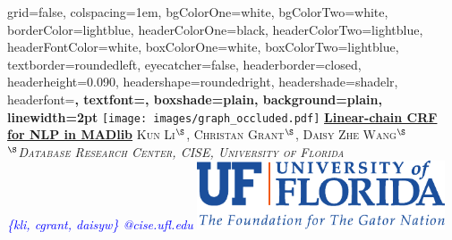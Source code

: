 \documentclass[landscape,final,a0paper,fontscale=0.285]{baposter}
\begin{document}
		\begin{poster}%
		  {
		  grid=false,
		  colspacing=1em,
		  bgColorOne=white,
		  bgColorTwo=white,
		  borderColor=lightblue,
		  headerColorOne=black,
		  headerColorTwo=lightblue,
		  headerFontColor=white,
		  boxColorOne=white,
		  boxColorTwo=lightblue,
		  textborder=roundedleft,
		  eyecatcher=false,
		  headerborder=closed,
		  headerheight=0.090\textheight,
		  headershape=roundedright,
		  headershade=shadelr,
		  headerfont=\Large\bf\textsc, %
		  textfont={\setlength{\parindent}{1.5em}},
		  boxshade=plain,
		  background=plain,
		  linewidth=2pt
		  }
		  {\texttt{[image: images/graph\_occluded.pdf]}} 
		  {\bf{\underline{Linear-chain CRF for NLP in MADlib}}\vspace{-0.17em}}
		  {\textsc{ Kun Li$^{\S}$, Christan Grant$^{\S}$, Daisy Zhe Wang$^{\S}$\\    
		                    {$^{\S}$\textit{Database Research Center, CISE, University of Florida} }}\\
		             {\textit{\textcolor{blue} {\{kli, cgrant, daisyw\} @cise.ufl.edu}}}}
		  {%
		    \includegraphics[height=5.5em]{logo/UF_Signature_Themeline.pdf}
		  }\vspace{-3mm}
		
		    \newcommand{\colouredcircle}{%
		      \tikz{\useasboundingbox (-0.2em,-0.32em) rectangle(0.2em,0.32em); \draw[draw=black,fill=lightblue,line width=0.03em] (0,0) circle(0.18em);}}
		

\end{poster}
\end{document}
